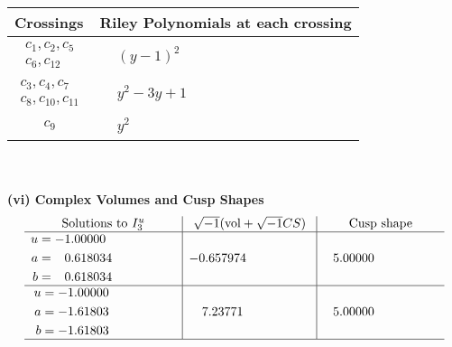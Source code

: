 \documentclass[1p]{elsarticle_modified}
\theoremstyle{definition}
\newcommand{\I}{\sqrt{-1}}
\begin{document}
\begin{tabular}{m{50pt}|m{274pt}}
Crossings & \hspace{64pt}Riley Polynomials at each crossing \\
\hline $$\begin{aligned}c_{1},c_{2},c_{5}\\c_{6},c_{12}\end{aligned}$$&$\begin{aligned}
&(y-1)^2
\end{aligned}$\\
\hline $$\begin{aligned}c_{3},c_{4},c_{7}\\c_{8},c_{10},c_{11}\end{aligned}$$&$\begin{aligned}
&y^2-3 y+1
\end{aligned}$\\
\hline $$\begin{aligned}c_{9}\end{aligned}$$&$\begin{aligned}
&y^2
\end{aligned}$\\
\hline
\end{tabular}\\~\\
\newpage\flushleft \textbf{(vi) Complex Volumes and Cusp Shapes}
$$\begin{array}{c|c|c}  
\text{Solutions to }I^u_{3}& \I (\text{vol} + \sqrt{-1}CS) & \text{Cusp shape}\\
 \hline 
\begin{aligned}
u &= -1.00000\phantom{ +0.000000I} \\
a &= \phantom{-}0.618034\phantom{ +0.000000I} \\
b &= \phantom{-}0.618034\phantom{ +0.000000I}\end{aligned}
 & -0.657974\phantom{ +0.000000I} & \phantom{-}5.00000\phantom{ +0.000000I} \\ \hline\begin{aligned}
u &= -1.00000\phantom{ +0.000000I} \\
a &= -1.61803\phantom{ +0.000000I} \\
b &= -1.61803\phantom{ +0.000000I}\end{aligned}
 & \phantom{-}7.23771\phantom{ +0.000000I} & \phantom{-}5.00000\phantom{ +0.000000I}\\
 \hline 
 \end{array}$$\newpage
\newpage\renewcommand{\arraystretch}{1}
\end{document}
